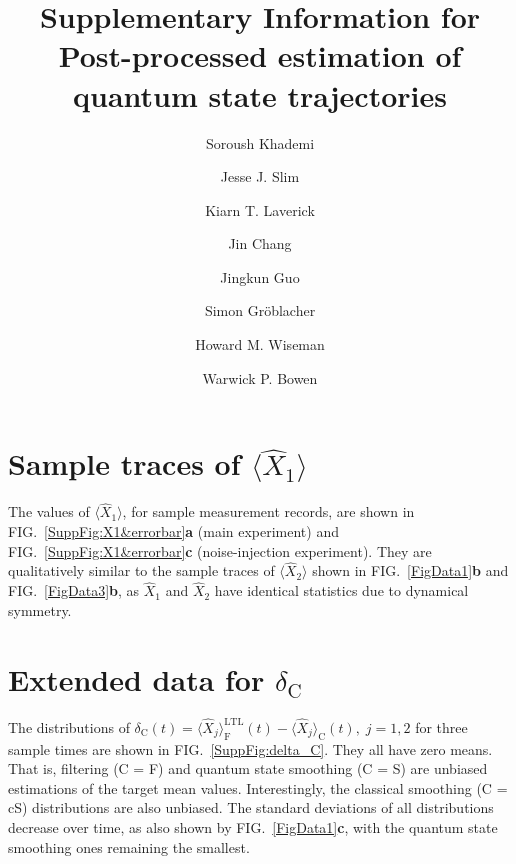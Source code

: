 \documentclass[aps,prx,onecolumn,superscriptaddress,floatfix,longbibliography,amsmath,amssymb]{revtex4-2}
\begin{document}
\title{Supplementary Information for \\ Post-processed estimation of quantum state trajectories}

\author{Soroush Khademi}

\author{Jesse J. Slim}

\author{Kiarn T. Laverick}

\author{Jin Chang}

\author{Jingkun Guo}

\author{Simon Gröblacher}

\author{Howard M. Wiseman}

\author{Warwick P. Bowen}

\maketitle

\section{Sample traces of \texorpdfstring{$\langle\hat{X}_1\rangle$}{<X_1>}}\label{sec:DataForX1}

The values of $\langle\hat{X}_1\rangle$, for sample measurement records, are shown in FIG.~\ref{SuppFig:X1&errorbar}\textbf{a} (main experiment) and FIG.~\ref{SuppFig:X1&errorbar}\textbf{c} (noise-injection experiment). They are qualitatively similar to the sample traces of $\langle\hat{X}_2\rangle$ shown in FIG.~\ref{FigData1}\textbf{b} and FIG.~\ref{FigData3}\textbf{b}, as $\hat{X}_1$ and $\hat{X}_2$ have identical statistics due to dynamical symmetry. 

\section{Extended data for $\delta_\text{C}$}

The distributions of $\delta_\text{C}(t)=\langle\hat{X}_j\rangle_\text{F}^\text{LTL}(t)-\langle\hat{X}_j\rangle_\text{C}(t),\;j=1,2$ for three sample times are shown in FIG.~\ref{SuppFig:delta_C}. They all have zero means. That is, filtering (C = F) and quantum state smoothing (C = S) are unbiased estimations of the target mean values. Interestingly, the classical smoothing (C = cS) distributions are also unbiased. The standard deviations of all distributions decrease over time, as also shown by FIG.~\ref{FigData1}\textbf{c}, with the quantum state smoothing ones remaining the smallest.
\end{document}
